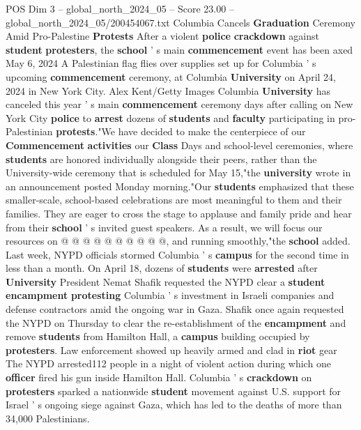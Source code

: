 \begin{textsample}{POS Dim 3 – global\_north\_2024\_05 – Score 23.00 – global\_north\_2024\_05/200454067.txt}  \label{ex:f3_pos_008}
Columbia Cancels \textbf{Graduation} Ceremony Amid Pro-Palestine \textbf{Protests} After a violent \textbf{police} \textbf{crackdown} against \textbf{student} \textbf{protesters}, the \textbf{school} ' s main \textbf{commencement} event has been axed May 6, 2024 A Palestinian flag flies over supplies set up for Columbia ' s upcoming \textbf{commencement} ceremony, at Columbia \textbf{University} on April 24, 2024 in New York City.
Alex Kent/Getty Images Columbia \textbf{University} has canceled this year ' s main \textbf{commencement} ceremony days after calling on New York City \textbf{police} to \textbf{arrest} dozens of \textbf{students} and \textbf{faculty} participating in pro-Palestinian \textbf{protests}."We have decided to make the centerpiece of our \textbf{Commencement} \textbf{activities} our \textbf{Class} Days and school-level ceremonies, where \textbf{students} are honored individually alongside their peers, rather than the University-wide ceremony that is scheduled for May 15,"the \textbf{university} wrote in an announcement posted Monday morning."Our \textbf{students} emphasized that these smaller-scale, school-based celebrations are most meaningful to them and their families.
They are eager to cross the stage to applause and family pride and hear from their \textbf{school} ' s invited guest speakers.
As a result, we will focus our resources on @ @ @ @ @ @ @ @ @ @, and running smoothly,"the \textbf{school} added.
Last week, NYPD officials stormed Columbia ' s \textbf{campus} for the second time in less than a month.
On April 18, dozens of \textbf{students} were \textbf{arrested} after \textbf{University} President Nemat Shafik requested the NYPD clear a \textbf{student} \textbf{encampment} \textbf{protesting} Columbia ' s investment in Israeli companies and defense contractors amid the ongoing war in Gaza.
Shafik once again requested the NYPD on Thursday to clear the re-establishment of the \textbf{encampment} and remove \textbf{students} from Hamilton Hall, a \textbf{campus} building occupied by \textbf{protesters}.
Law enforcement showed up heavily armed and clad in \textbf{riot} gear The NYPD arrested112 people in a night of violent action during which one \textbf{officer} fired his gun inside Hamilton Hall.
Columbia ' s \textbf{crackdown} on \textbf{protesters} sparked a nationwide \textbf{student} movement against U.S. support for Israel ' s ongoing siege against Gaza, which has led to the deaths of more than 34,000 Palestinians.

\end{textsample}
